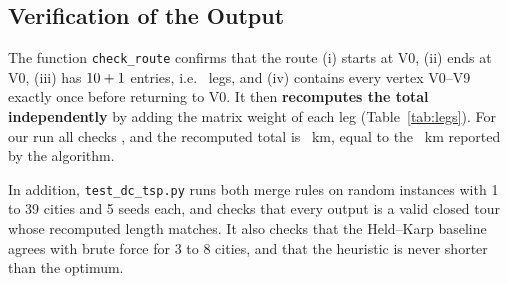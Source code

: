 \subsection{Verification of the Output}\label{sec:verification}
The function \texttt{check\_route} confirms that the route (i) starts at V0, (ii) ends at V0, (iii) has
$10 + 1$ entries, i.e.\ \NumVertices{} legs, and (iv) contains every vertex V0--V9 exactly once
before returning to V0. It then \textbf{recomputes the total independently} by adding the matrix weight of
each leg (Table~\ref{tab:legs}). For our run all checks \DCAllChecks{}, and the recomputed total is
\DCRecomputed{}~km, equal to the \DCTotal{}~km reported by the algorithm.

In addition, \texttt{test\_dc\_tsp.py} runs both merge rules on random instances with 1 to 39 cities and
5 seeds each, and checks that every output is a valid closed tour whose recomputed length matches. It
also checks that the Held--Karp baseline agrees with brute force for 3 to 8 cities, and that the
heuristic is never shorter than the optimum.
